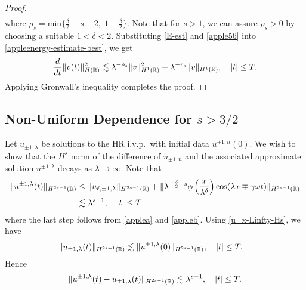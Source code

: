\begin{proof}
\begin{equation}
\begin{split}
\label{apple56}
\end{split}
\end{equation}
%
%
where $\rho_s = \text{min} \Big\{ \frac{\delta}{2} + s -2, \; 1-
\frac{\delta}{2} \Big\}$.  Note that for $s>1$, we can assure $\rho_s > 0$
by choosing a suitable $1<\delta<2$.
Substituting \eqref{E-est} and \eqref{apple56} into \eqref{appleenergy-estimate-best},
we get
%
%
\begin{equation}
\label{apple58}
\frac{d}{dt} \|v(t)\|_{H(\mathbb{R})}^2 \lesssim \lambda^{-\rho_s}
\|v\|_{H^1(\mathbb{R})}^2 + \lambda^{-r_s}
\|v \|_{H^1(\mathbb{R})}, \quad |t| \le T.
\end{equation}
%
%
Applying Gronwall's inequality completes the proof. 
\end{proof}
%
%
%
%

\subsection{Non-Uniform Dependence for $s>3/2$}
Let $u_{\pm 1,\lambda}$ be solutions to the HR i.v.p.\ with initial 
data $u^{\pm 1,
n}(0)$. We wish to show that the $H^s$ norm of the difference of $u_{\pm 1,
n}$ and the associated approximate solution $u^{\pm 1,\lambda}$
decays as $\lambda \to \infty$. Note that
%
%
\begin{equation*}
\begin{split}
\label{apple62}
\|u^{\pm 1, \lambda}(t)\|_{H^{2s-1}(\mathbb{R})}
& \le \|u_{\ell, \pm 1, \lambda}\|_{H^{2s-1}(\mathbb{R})} +
\| \lambda^{-\frac{\delta}{2} -s} \phi \left(
\frac{x}{\lambda^\delta} \right) \cos(\lambda x \mp \gamma \omega t)
\|_{H^{2s-1}(\mathbb{R})}
\\
& \lesssim \lambda^{s-1}, \quad |t| \le T
\end{split}
\end{equation*}
%
%
where the last step follows from \cref{applea} and \cref{appleb}.
Using \eqref{u_x-Linfty-Hs}, we have 
%
\begin{equation*}
\begin{split}
\|u_{\pm 1,\lambda} (t) \|_{H^{2s-1}(\mathbb{R})}
& \lesssim  \|u^{\pm 1,\lambda}(0) \|_{H^{2s-1}(\mathbb{R})}, \quad
|t| \le T.
\label{apple60}
\end{split}
\end{equation*}
%
%
%
%
Hence
%
\begin{equation}
\begin{split}
\|u^{\pm 1, \lambda}(t) - u_{\pm 1, \lambda}(t) \|_{H^{2s-1}(\mathbb{R})}
\lesssim \lambda^{s-1}, \quad |t| \le T.
\label{apple63}
\end{split}
\end{equation}
